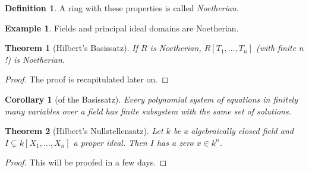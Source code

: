 \documentclass[DIV=14,parskip=half]{scrartcl}
\newtheorem{thm}{Theorem}[subsection]
\newtheorem{cor}{Corollary}[subsection]
\theoremstyle{definition}
\newtheorem{defi}{Definition}[subsection]
\newtheorem{example}{Example}[subsection]
\begin{document}
\begin{defi}\label{def:Noetherian}
 A ring with these properties is called \emph{Noetherian}.
\end{defi}
\begin{example}
 Fields and principal ideal domains are Noetherian. 
\end{example}
\begin{thm}[Hilbert's Basissatz]\label{thm:Basissatz}
 If $R$ is Noetherian, $R[T_1,\dots,T_n]$ (with finite $n$!) is Noetherian.
\end{thm}
\begin{proof}
 The proof is recapitulated later on.
\end{proof}
\begin{cor}[of the Basissatz]
 Every polynomial system of equations in finitely many variables over a field has finite subsystem with the same set of solutions.
\end{cor}
\begin{thm}[Hilbert's Nullstellensatz] \label{thm:Nullstellensatz}
 Let $k$ be a algebraically closed field and $I\subsetneq k[X_1,\dots,X_n]$ a proper ideal. Then $I$ has a zero $x\in k^n$.
\end{thm}
\begin{proof}
 This will be proofed in a few days.
\end{proof}
\end{document}
